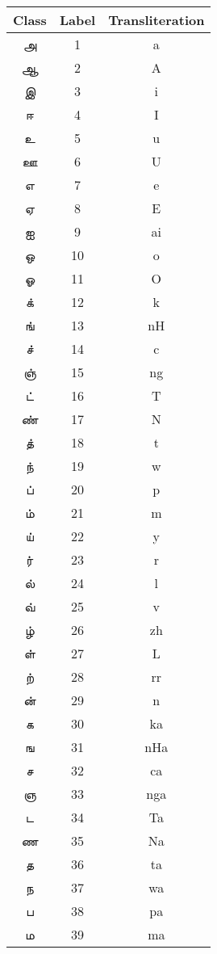 \documentclass[a4paper,10pt]{article}
\begin{document}
\begin{table}[!t]\center
\begin{tabular}{ccc}
\toprule
\textbf{Class} & \textbf{Label} & \textbf{Transliteration}  \\
\midrule
\t{ அ } & 1 & a \\
\t{ ஆ } & 2 & A \\
\t{ இ } & 3 & i \\
\t{ ஈ } & 4 & I \\
\t{ உ } & 5 & u \\
\t{ ஊ } & 6 & U \\
\t{ எ } & 7 & e \\
\t{ ஏ } & 8 & E \\
\t{ ஐ } & 9 & ai \\
\t{ ஒ } & 10 & o \\
\t{ ஓ } & 11 & O \\
\t{ க் } & 12 & k \\
\t{ ங் } & 13 & nH \\
\t{ ச் } & 14 & c \\
\t{ ஞ் } & 15 & ng \\
\t{ ட் } & 16 & T \\
\t{ ண் } & 17 & N \\
\t{ த் } & 18 & t \\
\t{ ந் } & 19 & w \\
\t{ ப் } & 20 & p \\
\t{ ம் } & 21 & m \\
\t{ ய் } & 22 & y \\
\t{ ர் } & 23 & r \\
\t{ ல் } & 24 & l \\
\t{ வ் } & 25 & v \\
\t{ ழ் } & 26 & zh \\
\t{ ள் } & 27 & L \\
\t{ ற் } & 28 & rr \\
\t{ ன் } & 29 & n \\
\t{ க } & 30 & ka \\
\t{ ங } & 31 & nHa \\
\t{ ச } & 32 & ca \\
\t{ ஞ } & 33 & nga \\
\t{ ட } & 34 & Ta \\
\t{ ண } & 35 & Na \\
\t{ த } & 36 & ta \\
\t{ ந } & 37 & wa \\
\t{ ப } & 38 & pa \\
\t{ ம } & 39 & ma \\

\end{tabular}
\end{table}
\end{document}
